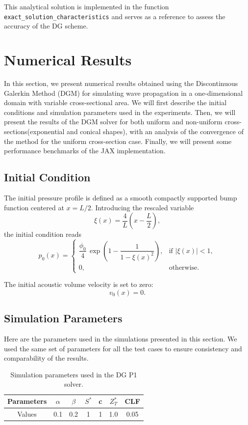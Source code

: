 \documentclass[11pt,a4paper]{report}
\theoremstyle{plain}
\theoremstyle{definition}
\begin{document}
This analytical solution is implemented in the function \texttt{exact\_solution\_characteristics} and serves as a reference to assess the accuracy of the DG scheme.



\chapter{Numerical Results}

\minitoc
\vspace{1em}
In this section, we present numerical results obtained using the Discontinuous Galerkin Method (DGM) 
for simulating wave propagation in a one-dimensional domain with variable cross-sectional area.
We will first describe the initial conditions and simulation parameters used in the experiments.
Then, we will present the results of the DGM solver for both uniform and non-uniform cross-sections(exponential and conical shapes),
with an analysis of the convergence of the method for the uniform cross-section case. 
Finally, we will present some performance benchmarks of the JAX implementation.

\newpage
\section{Initial Condition}
The initial pressure profile is defined as a smooth compactly supported bump function
centered at $x=L/2$. Introducing the rescaled variable
\begin{equation}
\xi(x) = \frac{4}{L}\left(x - \frac{L}{2}\right),
\end{equation}
the initial condition reads
\begin{equation}
p_0(x) =
\begin{cases}
\dfrac{\phi_0}{4}\,
\exp\!\left(1 - \dfrac{1}{1-\xi(x)^2}\right),
& \text{if } |\xi(x)| < 1, \\[1.2ex]
0, & \text{otherwise}.
\end{cases}
\end{equation}

The initial acoustic volume velocity is set to zero:
\begin{equation}
v_0(x) = 0.
\end{equation}

\section{Simulation Parameters}
Here are the parameters used in the simulations presented in this section.
We used the same set of parameters for all the test cases to ensure consistency 
and comparability of the results.
\begin{table}[h!]
\centering
\begin{tabular}{c cccccc}
\hline
Parameters & $\alpha$ & $\beta$ & $S^\ast$ & c & $Z^\ast_T$ & CLF \\
\hline
Values & 0.1 & 0.2 & 1 & 1 & 1.0 & 0.05 \\
\hline
\end{tabular}
\caption{Simulation parameters used in the DG P1 solver.}
\label{tab:sim_parameters}
\end{table}
\end{document}
